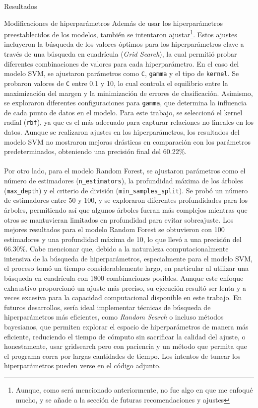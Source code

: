 \documentclass[11pt]{article}
\begin{document}
\begin{section}{Resultados}
\begin{subsubsection}{Modificaciones de hiperparámetros}
    Además de usar los hiperparámetros preestablecidos de los modelos, también se intentaron ajustar\footnote{Aunque, como será mencionado anteriormente, no fue algo en que me enfoqué mucho, y se añade a la sección de futuras recomendaciones y ajustes}. Estos ajustes incluyeron la búsqueda de los valores óptimos para los hiperparámetros clave a través de una búsqueda en cuadrícula (\textit{Grid Search}), la cual permitió probar diferentes combinaciones de valores para cada hiperparámetro. En el caso del modelo SVM, se ajustaron parámetros como \texttt{C}, \texttt{gamma} y el tipo de \texttt{kernel}. Se probaron valores de \texttt{C} entre 0.1 y 10, lo cual controla el equilibrio entre la maximización del margen y la minimización de errores de clasificación. Asimismo, se exploraron diferentes configuraciones para \texttt{gamma}, que determina la influencia de cada punto de datos en el modelo. Para este trabajo, se seleccionó el kernel radial (\texttt{rbf}), ya que es el más adecuado para capturar relaciones no lineales en los datos. Aunque se realizaron ajustes en los hiperparámetros, los resultados del modelo SVM no mostraron mejoras drásticas en comparación con los parámetros predeterminados, obteniendo una precisión final del 60.22\%.
    \\
    \\
    Por otro lado, para el modelo Random Forest, se ajustaron parámetros como el número de estimadores (\texttt{n\_estimators}), la profundidad máxima de los árboles (\texttt{max\_depth}) y el criterio de división (\texttt{min\_samples\_split}). Se probó un número de estimadores entre 50 y 100, y se exploraron diferentes profundidades para los árboles, permitiendo así que algunos árboles fueran más complejos mientras que otros se mantuvieran limitados en profundidad para evitar sobreajuste. Los mejores resultados para el modelo Random Forest se obtuvieron con 100 estimadores y una profundidad máxima de 10, lo que llevó a una precisión del 66.30\%. Cabe mencionar que, debido a la naturaleza computacionalmente intensiva de la búsqueda de hiperparámetros, especialmente para el modelo SVM, el proceso tomó un tiempo considerablemente largo, en particular al utilizar una búsqueda en cuadrícula con 1800 combinaciones posibles. Aunque este enfoque exhaustivo proporcionó un ajuste más preciso, su ejecución resultó ser lenta y a veces excesiva para la capacidad computacional disponible en este trabajo. En futuros desarrollos, sería ideal implementar técnicas de búsqueda de hiperparámetros más eficientes, como \textit{Random Search} o incluso métodos bayesianos, que permiten explorar el espacio de hiperparámetros de manera más eficiente, reduciendo el tiempo de cómputo sin sacrificar la calidad del ajuste, o honestamente, usar gridsearch pero con paciencia y un método que permita que el programa corra por largas cantidades de tiempo. Los intentos de tunear los hiperparámetros pueden verse en el código adjunto.
\end{subsubsection}

\end{section}
\end{document}
